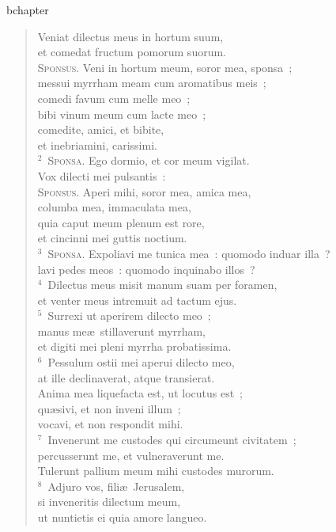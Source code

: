 bchapter\begin{verse}\vspace{-19pt}Veniat dilectus meus in hortum suum,\\ et comedat fructum pomorum suorum.\\ \textsc{Sponsus.} Veni in hortum meum, soror mea, sponsa~;\\ messui myrrham meam cum aromatibus meis~;\\ comedi favum cum melle meo~;\\ bibi vinum meum cum lacte meo~;\\ comedite, amici, et bibite,\\ et inebriamini, carissimi.\\
${}^{2}$~\textsc{Sponsa.} Ego dormio, et cor meum vigilat.\\ Vox dilecti mei pulsantis~:\\ \textsc{Sponsus.} Aperi mihi, soror mea, amica mea,\\ columba mea, immaculata mea,\\ quia caput meum plenum est rore,\\ et cincinni mei guttis noctium.\\
${}^{3}$~\textsc{Sponsa.} Expoliavi me tunica mea~: quomodo induar illa~?\\ lavi pedes meos~: quomodo inquinabo illos~?\\
${}^{4}$~Dilectus meus misit manum suam per foramen,\\ et venter meus intremuit ad tactum ejus.\\
${}^{5}$~Surrexi ut aperirem dilecto meo~;\\ manus me\ae\ stillaverunt myrrham,\\ et digiti mei pleni myrrha probatissima.\\
${}^{6}$~Pessulum ostii mei aperui dilecto meo,\\ at ille declinaverat, atque transierat.\\ Anima mea liquefacta est, ut locutus est~;\\ qu\ae sivi, et non inveni illum~;\\ vocavi, et non respondit mihi.\\
${}^{7}$~Invenerunt me custodes qui circumeunt civitatem~;\\ percusserunt me, et vulneraverunt me.\\ Tulerunt pallium meum mihi custodes murorum.\\
${}^{8}$~Adjuro vos, fili\ae\ Jerusalem,\\ si inveneritis dilectum meum,\\ ut nuntietis ei quia amore langueo.\\

\end{verse}
